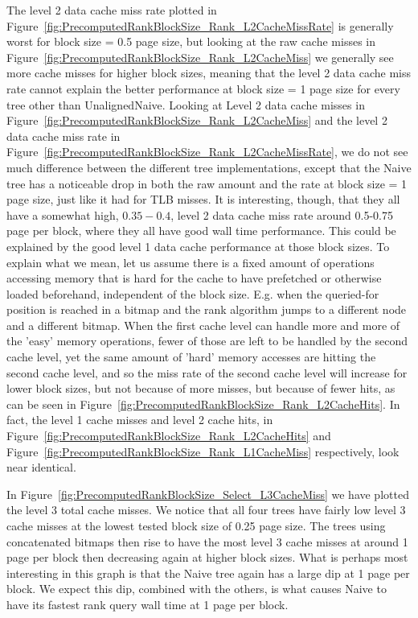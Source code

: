 The level 2 data cache miss rate plotted in Figure~\ref{fig:PrecomputedRankBlockSize_Rank_L2CacheMissRate} is generally worst for block size = 0.5 page size, but looking at the raw cache misses in Figure~\ref{fig:PrecomputedRankBlockSize_Rank_L2CacheMiss} we generally see more cache misses for higher block sizes, meaning that the level 2 data cache miss rate cannot explain the better performance at block size = 1 page size for every tree other than UnalignedNaive.
Looking at Level 2 data cache misses in Figure~\ref{fig:PrecomputedRankBlockSize_Rank_L2CacheMiss} and the level 2 data cache miss rate in Figure~\ref{fig:PrecomputedRankBlockSize_Rank_L2CacheMissRate}, we do not see much difference between the different tree implementations, except that the Naive tree has a noticeable drop in both the raw amount and the rate at block size = 1 page size, just like it had for TLB misses.
It is interesting, though, that they all have a somewhat high, $0.35-0.4$, level 2 data cache miss rate around 0.5-0.75 page per block, where they all have good wall time performance.
This could be explained by the good level 1 data cache performance at those block sizes.
To explain what we mean, let us assume there is a fixed amount of operations accessing memory that is hard for the cache to have prefetched or otherwise loaded beforehand, independent of the block size.
E.g. when the queried-for position is reached in a bitmap and the rank algorithm jumps to a different node and a different bitmap.
When the first cache level can handle more and more of the 'easy' memory operations, fewer of those are left to be handled by the second cache level, yet the same amount of 'hard' memory accesses are hitting the second cache level, and so the miss rate of the second cache level will increase for lower block sizes, but not because of more misses, but because of fewer hits, as can be seen in Figure~\ref{fig:PrecomputedRankBlockSize_Rank_L2CacheHits}.
In fact, the level 1 cache misses and level 2 cache hits, in Figure~\ref{fig:PrecomputedRankBlockSize_Rank_L2CacheHits} and Figure~\ref{fig:PrecomputedRankBlockSize_Rank_L1CacheMiss} respectively, look near identical.

In Figure~\ref{fig:PrecomputedRankBlockSize_Select_L3CacheMiss} we have plotted the level 3 total cache misses.
We notice that all four trees have fairly low level 3 cache misses at the lowest tested block size of 0.25 page size.
The trees using concatenated bitmaps then rise to have the most level 3 cache misses at around 1 page per block then decreasing again at higher block sizes.
What is perhaps most interesting in this graph is that the Naive tree again has a large dip at 1 page per block.
We expect this dip, combined with the others, is what causes Naive to have its fastest rank query wall time at 1 page per block.


